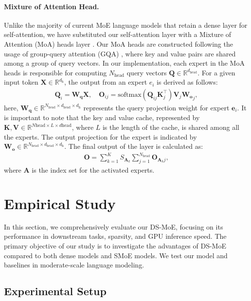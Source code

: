 \paragraph{Mixture of Attention Head.} 
Unlike the majority of current MoE language models that retain a dense layer for self-attention, we have substituted our self-attention layer with a Mixture of Attention (MoA) heads layer \cite{zhang2022mixture}. Our MoA heads are constructed following the usage of group-query attention (GQA) \cite{ainslie2023gqa}, where key and value pairs are shared among a group of query vectors. In our implementation, each expert in the MoA heads is responsible for computing $N_{\mathrm{head}}$ query vectors $\mathbf{Q}\in \mathbb{R}^{d_\mathrm{{head}}}$. For a given input token $\mathbf{X}\in \mathbb{R}^{d_\mathrm{h}}$, the output from an expert $e_i$ is derived as follows:
\begin{align}
\mathbf{Q}_{i} = \mathbf{W_q}\mathbf{X}, \quad
    \mathbf{O}_{ij} = \mathrm{softmax}(\mathbf{Q}_{ij}\mathbf{K}_j^\intercal)\mathbf{V}_j\mathbf{W_o}_j,
\end{align}
here, $\mathbf{W_q}\in \mathbb{R}^{N_{\mathrm{head}}\times d_\mathrm{{head}}\times d_\mathrm{{h}}}$ represents the query projection weight for expert $\mathbf{e}_i$. It is important to note that the key and value cache, represented by $\mathbf{K}, \mathbf{V}\in \mathbb{R}^{N\mathrm{head} \times L\times d\mathrm{head}}$, where $L$ is the length of the cache, is shared among all the experts.
The output projection for the expert is indicated by $\mathbf{W_o}\in \mathbb{R}^{N_{\mathrm{head}}\times d_\mathrm{head}\times d_\mathrm{h}}$. The final output of the layer is calculated as:
\begin{align}
    \mathbf{O} = \sum_{k=1}^K S_{\mathbf{A}_k} \sum_{j=1}^{N_\mathrm{head}}\mathbf{O}_{\mathbf{A}_kj},
\end{align}
where $\mathbf{A}$ is the index set for the activated experts.
\section{Empirical Study}
In this section, we comprehensively evaluate our DS-MoE, focusing on its performance in downstream tasks, sparsity, and GPU inference speed. The primary objective of our study is to investigate the advantages of DS-MoE compared to both dense models and SMoE models. We test our model and baselines in moderate-scale language modeling.

\subsection{Experimental Setup}

